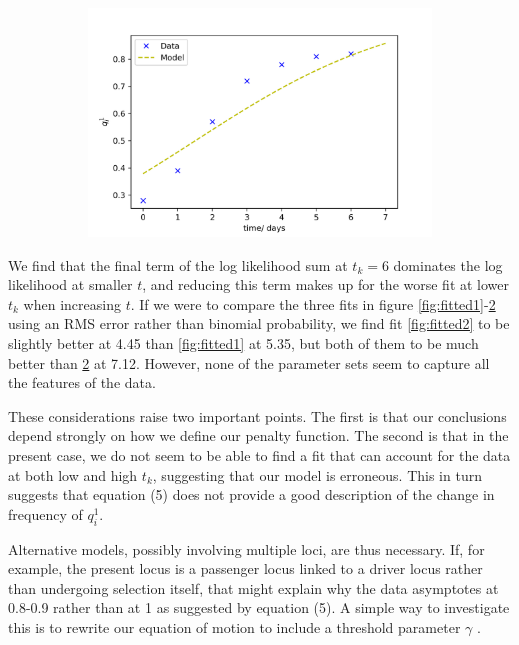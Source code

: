 \documentclass{article}
\begin{document}
\begin{figure}[h]
	\begin{subfigure}[t]{0.31\linewidth}
		\centering
		\includegraphics[width = 1.0\linewidth, trim={10 5 30 30}, clip=true]{fit_model2.png}
		\label{fig:fitted3}	
	\end{subfigure}%
\end{figure}

We find that the final term of the log likelihood sum at $t_k=6$ dominates the log likelihood at smaller $t$, and reducing this term makes up for the worse fit at lower $t_k$ when increasing $t$. If we were to compare the three fits in figure \ref{fig:fitted1}-\ref{fig:fitted3} using an RMS error rather than binomial probability, we find fit \ref{fig:fitted2} to be slightly better at 4.45 than \ref{fig:fitted1} at 5.35, but both of them to be much better than \ref{fig:fitted3} at 7.12. However, none of the parameter sets seem to capture all the features of the data.

These considerations raise two important points. The first is that our conclusions depend strongly on how we define our penalty function. The second is that in the present case, we do not seem to be able to find a fit that can account for the data at both low and high $t_k$, suggesting that our model is erroneous. This in turn suggests that equation (5) does not provide a good description of the change in frequency of $q_i^1$.

Alternative models, possibly involving multiple loci, are thus necessary. If, for example, the present locus is a passenger locus linked to a driver locus rather than undergoing selection itself, that might explain why the data asymptotes at 0.8-0.9 rather than at 1 as suggested by equation (5).  A simple way to investigate this is to rewrite our equation of motion to include a threshold parameter $\gamma$ .
\end{document}
